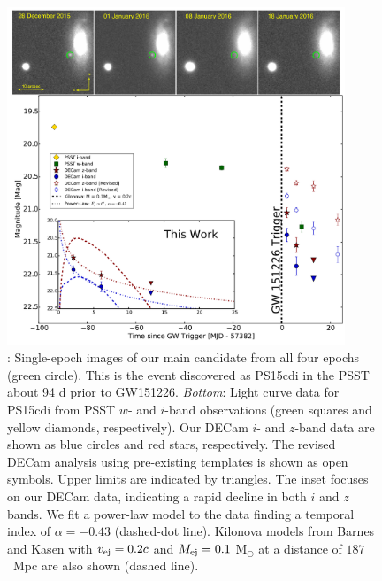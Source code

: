  \begin{figure}[t!]
 \centering
 \includegraphics[width=0.9\textwidth]{./figs/chapter4/fig2.pdf}
 \caption{\singlespace {}: Single-epoch images of our main candidate
 from all four epochs (green circle). This is the event discovered as PS15cdi in
 the PSST about 94 d prior to GW151226. {\it Bottom}: Light
 curve data for PS15cdi from PSST $w$- and $i$-band
 observations (green squares and yellow diamonds, respectively).
 Our DECam $i$- and $z$-band data are shown as
 blue circles and red stars, respectively. The revised DECam analysis
 using pre-existing templates is shown as open symbols. Upper
 limits are indicated by triangles. The inset focuses on our
 DECam data, indicating a rapid decline in both $i$ and $z$
 bands.  We fit a power-law model to the data finding a temporal index of
 $\alpha = -0.43$ (dashed-dot line). Kilonova models from Barnes and
 Kasen \citeyearpar{BarnesKasen13} with $v_{\rm ej}=0.2c$ and $M_{\rm ej}=0.1$ M$_\odot$
 at a distance of $187$~Mpc are also shown (dashed line).}
 \label{fig:ch4_PS15cdi}
 \end{figure}

